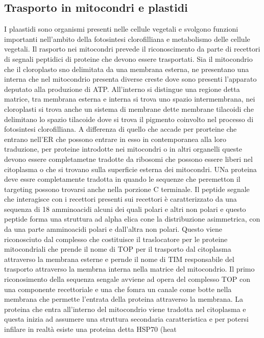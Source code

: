 \subsection{Trasporto in mitocondri e plastidi}
I plaastidi sono organismi presenti nelle cellule vegetali e svolgono funzioni importanti nell'ambito della fotosintesi clorofilliana e metabolismo delle cellule vegetali. Il rasporto
nei mitocondri prevede il riconoscimento da parte di recettori di segnali peptidici di proteine che devono essere trasportati. Sia il mitocondrio che il cloroplasto sno delimitata da
una membrana esterna, ne presentano una interna che nel mitocondrio presenta diverse creste dove sono presenti l'apparato deputato alla produzione di ATP. All'interno si distingue una 
regione detta matrice, tra membrana esterna e interna si trova uno spazio intermembrana, nei cloroplasti si trova anche un sistema di membrane dette membrane tilacoidi che delimitano
lo spazio tilacoide dove si trova il pigmento coinvolto nel processo di fotosintesi clorofilliana. A differenza di quello che accade per prorteine che entrano nell'ER che possono entrare
in esso in contemporanea alla loro traduzione, per proteine introdotte nei mitocondri o in altri organelli queste devono essere completametne tradotte da ribosomi che possono essere 
liberi nel citoplasma o che si trovano sulla superficie esterna dei mitocondri. UNa proteina deve essre completamente tradotta in quando le sequenze che peremetton il targeting possono
trovarsi anche nella porzione C terminale. Il peptide segnale che interagisce con i recettori presenti sui recettori \`e caratterizzato da una sequenza di 18 amminoacidi alcuni dei quali
polari e altri non polari e questo peptide forma una struttura ad alpha elica cone la distribuzione asimmetrica, con da una parte amminoacidi polari e dall'altra non polari. Questo viene
riconosciuto dal complesso che costituisce il traslocatore per le proteine mitocondriali che prende il nome di TOP per il trasporto dal citoplasma attraverso la membrana esterne e 
pernde il nome di TIM responsabile del trasporto attraverso la membrna interna nella matrice del mitocondrio. Il primo riconosimento della sequenza sengale avviene ad opera del complesso 
TOP con una componente recettoriale e una che fomra un canale come botte nella membrana che permette l'entrata della proteina attraverso la membrana. La proteina che entra all'interno del
mitocondrio viene tradotta nel citoplasma e questa inizia ad assumere una struttura secondaria caratteristica e per potersi infilare in realt\`a esiste una proteina detta HSP70 (heat 
